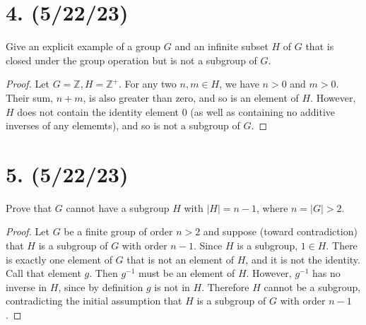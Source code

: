 \documentclass{article}
\begin{document}
\section*{4. (5/22/23)}

Give an explicit example of a group $G$ and an infinite subset $H$ of $G$ that is closed under the group operation but is not a subgroup of $G$.

\begin{proof}
    Let $G = \mathbb{Z}, H = \mathbb{Z}^+$. For any two $n, m \in H$, we have $n > 0$ and $m > 0$. Their sum, $n + m$, is also greater than zero, and so is an element of $H$. However, $H$ does not contain the identity element 0 (as well as containing no additive inverses of any elememts), and so is not a subgroup of $G$.
\end{proof}

\section*{5. (5/22/23)}

Prove that $G$ cannot have a subgroup $H$ with $|H| = n - 1$, where $n = |G| > 2$.

\begin{proof}
    Let $G$ be a finite group of order $n > 2$ and suppose (toward contradiction) that $H$ is a subgroup of $G$ with order $n - 1$. Since $H$ is a subgroup, $1 \in H$. There is exactly one element of $G$ that is not an element of $H$, and it is not the identity. Call that element $g$. Then $g^{-1}$ must be an element of $H$. However, $g^{-1}$ has no inverse in $H$, since by definition $g$ is not in $H$. Therefore $H$ cannot be a subgroup, contradicting the initial assumption that $H$ is a subgroup of $G$ with order $n - 1$.
\end{proof}
\end{document}
